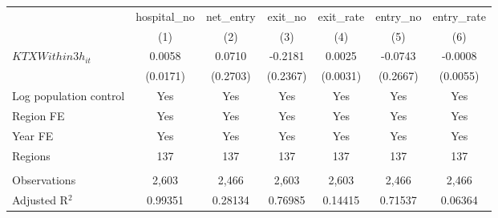 \begingroup
\centering
\begin{tabular}{lcccccc}
   \toprule
                          & hospital\_no  & net\_entry  & exit\_no  & exit\_rate  & entry\_no  & entry\_rate \\    
                          & (1)           & (2)         & (3)       & (4)         & (5)        & (6)\\  
   \midrule 
   $KTXWithin3h_{it}$     & 0.0058        & 0.0710      & -0.2181   & 0.0025      & -0.0743    & -0.0008\\   
                          & (0.0171)      & (0.2703)    & (0.2367)  & (0.0031)    & (0.2667)   & (0.0055)\\   
   Log population control & Yes           & Yes         & Yes       & Yes         & Yes        & Yes\\  
   Region FE              & Yes           & Yes         & Yes       & Yes         & Yes        & Yes\\  
   Year FE                & Yes           & Yes         & Yes       & Yes         & Yes        & Yes\\  
   Regions                & 137           & 137         & 137       & 137         & 137        & 137\\  
    \\
   Observations           & 2,603         & 2,466       & 2,603     & 2,603       & 2,466      & 2,466\\  
   Adjusted R$^2$         & 0.99351       & 0.28134     & 0.76985   & 0.14415     & 0.71537    & 0.06364\\  
   \bottomrule
\end{tabular}
\par\endgroup
